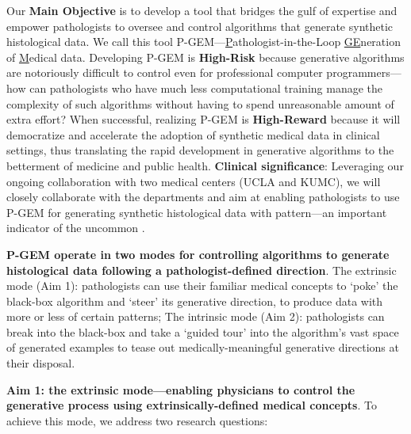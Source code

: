 Our {\bf Main Objective} is to develop a tool that bridges the gulf of expertise and empower pathologists to oversee and control algorithms that generate synthetic histological data.
We call this tool P-GEM---{\underline P}athologist-in-the-Loop \underline{GE}neration of {\underline M}edical data.
% 
Developing P-GEM is {\bf High-Risk} because generative algorithms are notoriously difficult to control even for professional computer programmers---how can pathologists who have much less computational training manage the complexity of such algorithms without having to spend unreasonable amount of extra effort?
When successful, realizing P-GEM is {\bf High-Reward} because it will democratize and accelerate the adoption of synthetic medical data in clinical settings, thus translating the rapid development in generative algorithms to the betterment of medicine and public health.
% 
% 
{\bf Clinical significance}: Leveraging our ongoing collaboration with two medical centers (UCLA and KUMC), we will closely collaborate with the \xx departments and aim at enabling \xx pathologists to use P-GEM for generating synthetic histological data with \xx pattern---an important indicator of the uncommon \xx [disease].

{\bf P-GEM operate in two modes for controlling algorithms to generate histological data following a pathologist-defined direction}. The extrinsic mode (Aim 1): pathologists can use their familiar medical concepts to `poke' the black-box algorithm and `steer' its generative direction, \eg to produce data with more or less of certain patterns; The intrinsic mode (Aim 2): pathologists can break into the black-box and take a `guided tour' into the algorithm's vast space of generated examples to tease out medically-meaningful generative directions at their disposal.

{\bf Aim 1: the extrinsic mode---enabling physicians to control the generative process using extrinsically-defined medical concepts}.
To achieve this mode, we address two research questions:

